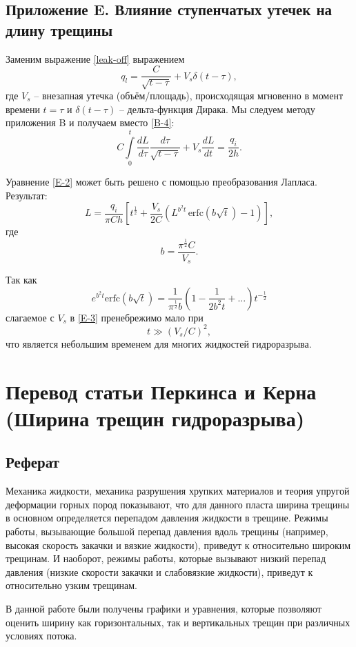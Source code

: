 \documentclass[a4paper, 12pt]{article}
\newcommand{\beq}{\begin{equation}}
\newcommand{\eeq}{\end{equation}}
\begin{document}
\subsection{Приложение E. Влияние ступенчатых утечек на длину трещины}

Заменим выражение \eqref{leak-off} выражением
\beq\label{E-1}
q_l=\frac{C}{\sqrt{t-\tau}}+V_s\delta(t-\tau),
\tag{E-1}
\eeq
где $V_s$ -- внезапная утечка (объём/площадь), происходящая мгновенно в момент времени $t=\tau$ и $\delta(t-\tau)$ -- дельта-функция Дирака.
Мы следуем методу приложения B и получаем вместо \eqref{B-4}:
\beq\label{E-2}
C\int\limits_{0}^{t}{\frac{dL}{d\tau}}\frac{d\tau}{\sqrt{t-\tau}}+V_s\frac{dL}{dt}=\frac{q_i}{2h}.
\tag{E-2}
\eeq

Уравнение \eqref{E-2} может быть решено с помощью преобразования Лапласа.
Результат:
\beq\label{E-3}
L=\frac{q_i}{\pi Ch}\left[t^{\frac{1}{2}}+\frac{V_s}{2C}\left(L^{b^2t}\,\textrm{erfc}\!\left(b\sqrt{t}\right)-1\right)\right],
\tag{E-3}
\eeq
где
$$
b=\frac{\pi^{\frac{1}{2}}C}{V_s}.
$$

Так как
\beq\label{E-4}
e^{b^2t}\textrm{erfc}\!\left(b\sqrt{t}\right)=\frac{1}{\pi^{\frac{1}{2}}b}\left(1-\frac{1}{2b^2t}+...\right)t^{-\frac{1}{2}}
\tag{E-4}
\eeq
слагаемое с $V_s$ в \eqref{E-3} пренебрежимо мало при
\beq\label{E-5}
t\gg(V_s/C)^2,
\tag{E-5}
\eeq
что является небольшим временем для многих жидкостей гидроразрыва.

\newpage

\section{Перевод статьи Перкинса и Керна (Ширина трещин гидроразрыва)}

\subsection{Реферат}

Механика жидкости, механика разрушения хрупких материалов и теория упругой деформации горных пород показывают, что для данного пласта ширина трещины в основном определяется перепадом давления жидкости в трещине.
Режимы работы, вызывающие большой перепад давления вдоль трещины (например, высокая скорость закачки и вязкие жидкости), приведут к относительно широким трещинам.
И наоборот, режимы работы, которые вызывают низкий перепад давления (низкие скорости закачки и слабовязкие жидкости), приведут к относительно узким трещинам.

В данной работе были получены графики и уравнения, которые позволяют оценить ширину как горизонтальных, так и вертикальных трещин при различных условиях потока.
\end{document}
